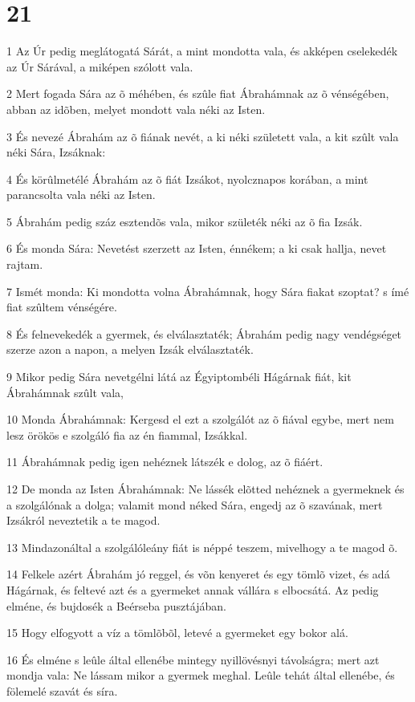 \chapter{21}

\par 1 Az Úr pedig meglátogatá Sárát, a mint mondotta vala, és akképen cselekedék az Úr Sárával, a miképen szólott vala.
\par 2 Mert fogada Sára az õ méhében, és szûle fiat Ábrahámnak az õ vénségében, abban az  idõben, melyet mondott vala néki az Isten.
\par 3 És nevezé Ábrahám az õ fiának nevét, a ki néki született vala, a kit szûlt vala néki Sára, Izsáknak:
\par 4 És körûlmetélé Ábrahám az õ fiát Izsákot, nyolcznapos korában, a mint parancsolta vala néki az Isten.
\par 5 Ábrahám pedig száz esztendõs vala, mikor születék néki az õ fia Izsák.
\par 6 És monda Sára: Nevetést szerzett az Isten, énnékem; a ki csak hallja, nevet rajtam.
\par 7 Ismét monda: Ki mondotta volna Ábrahámnak, hogy Sára fiakat szoptat? s ímé fiat szûltem vénségére.
\par 8 És felnevekedék a gyermek, és elválasztaték; Ábrahám pedig nagy vendégséget szerze azon a napon, a melyen Izsák elválasztaték.
\par 9 Mikor pedig Sára nevetgélni látá az Égyiptombéli Hágárnak fiát, kit Ábrahámnak szûlt vala,
\par 10 Monda Ábrahámnak: Kergesd el ezt a szolgálót az õ fiával egybe, mert nem lesz örökös e szolgáló fia az én fiammal, Izsákkal.
\par 11 Ábrahámnak pedig igen nehéznek látszék e dolog, az õ fiáért.
\par 12 De monda az Isten Ábrahámnak: Ne lássék elõtted nehéznek a gyermeknek és a szolgálónak a dolga; valamit mond néked Sára, engedj az õ szavának, mert Izsákról neveztetik a te magod.
\par 13 Mindazonáltal a szolgálóleány fiát is néppé teszem, mivelhogy a te magod õ.
\par 14 Felkele azért Ábrahám jó reggel, és võn kenyeret és egy tömlõ vizet, és adá Hágárnak, és feltevé azt és a gyermeket annak vállára s elbocsátá. Az pedig elméne, és bujdosék a Beérseba pusztájában.
\par 15 Hogy elfogyott a víz a tömlõbõl, letevé a gyermeket egy bokor alá.
\par 16 És elméne s leûle által ellenébe mintegy nyillövésnyi távolságra; mert azt mondja vala: Ne lássam mikor a gyermek meghal. Leûle tehát által ellenébe, és fölemelé szavát és síra.
